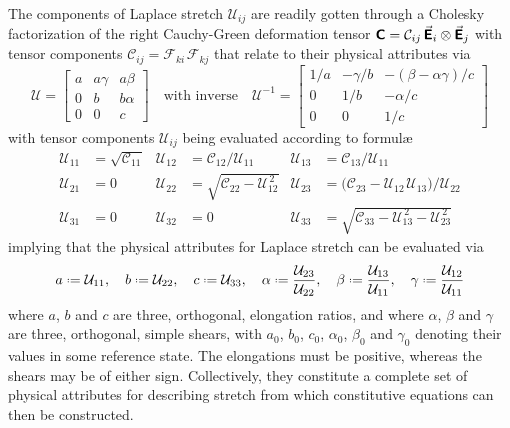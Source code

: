 The components of Laplace stretch $\mathcal{U}_{ij}$ are readily gotten through a Cholesky factorization of the right Cauchy-Green deformation tensor $\boldsymbol{\mathsf{C}} = \mathcal{C}_{ij} \, \vec{\boldsymbol{\mathsf{E}}}_i \otimes \vec{\boldsymbol{\mathsf{E}}}_j$ with tensor components $\mathcal{C}_{ij} = \mathcal{F}_{ki\,} \mathcal{F}_{kj}$ that relate to their physical attributes via \cite{Freed17}
\begin{equation} 
\boldsymbol{\mathcal{U}} = 
\begin{bmatrix}
a & a \gamma & a \beta \\ 0 & b & b \alpha \\ 0 & 0 & c
\end{bmatrix} 
\quad \text{with inverse} \quad
\boldsymbol{\mathcal{U}}^{-1} = \begin{bmatrix}
1/a & -\gamma / b & -( \beta - \alpha\gamma ) / c \\
0 & 1/b & -\alpha / c \\
0 & 0 & 1/c
\end{bmatrix}
\label{LaplaceStretch3D}
\end{equation}
with tensor components $\mathcal{U}_{ij}$ being evaluated according to formul\ae\ \cite{Srinivasa12}
\begin{equation}
\begin{aligned}
\mathcal{U}_{11} & = \sqrt{\mathcal{C}_{11}} & 
\mathcal{U}_{12} & = \mathcal{C}_{12} / \mathcal{U}_{11} &
\mathcal{U}_{13} & = \mathcal{C}_{13} / \mathcal{U}_{11} \\
\mathcal{U}_{21} & = 0 &
\mathcal{U}_{22} & = \sqrt{\mathcal{C}_{22} - \mathcal{U}_{12}^{\,2}} &
\mathcal{U}_{23} & = \bigl( \mathcal{C}_{23} - 
\mathcal{U}_{12\,} \mathcal{U}_{13} \bigr) / \mathcal{U}_{22} \\
\mathcal{U}_{31} & = 0 &
\mathcal{U}_{32} & = 0 & 
\mathcal{U}_{33} & = \sqrt{\mathcal{C}_{33} - \mathcal{U}_{13}^{\,2} - 
    \mathcal{U}_{23}^{\,2}}
\end{aligned}
\label{LagrangianLaplaceStretch3D}
\end{equation}
implying that the physical attributes for Laplace stretch can be evaluated via
\begin{equation}
a \defeq \mathcal{U}_{11} , \quad
b \defeq \mathcal{U}_{22} , \quad
c \defeq \mathcal{U}_{33} , \quad
\alpha \defeq \frac{\mathcal{U}_{23}}{\mathcal{U}_{22}} , \quad
\beta \defeq \frac{\mathcal{U}_{13}}{\mathcal{U}_{11}} , \quad
\gamma \defeq \frac{\mathcal{U}_{12}}{\mathcal{U}_{11}}
\label{LagrangianPhysicalAttributes3D}
\end{equation}
where $a$, $b$ and $c$ are three, orthogonal, elongation ratios, and where $\alpha$, $\beta$ and $\gamma$ are three, orthogonal, simple shears, with $a_0$, $b_0$, $c_0$, $\alpha_0$, $\beta_0$ and $\gamma_0$ denoting their values in some reference state. The elongations must be positive, whereas the shears may be of either sign. Collectively, they constitute a complete set of physical attributes for describing stretch from which constitutive equations can then be constructed. 

